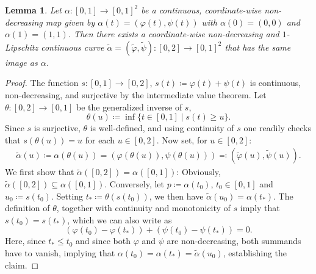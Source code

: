 \documentclass[a4paper,11pt]{article}
\numberwithin{equation}{section}
\theoremstyle{plain}
\newtheorem{Lemma}[Definition]{Lemma}
\theoremstyle{definition}
\begin{document}
\begin{appendices}
\begin{Lemma}\label{Lem:parametrization} Let $\alpha \colon [0, 1] \to [0, 1]^2$ be a continuous, coordinate-wise non-decreasing map given by $\alpha(t) = (\varphi(t), \psi(t))$ with $\alpha(0) = (0, 0)$ and $\alpha(1) = (1, 1)$. Then there exists a coordinate-wise non-decreasing and $1$-Lipschitz continuous curve $\tilde{\alpha} = (\tilde{\varphi},\tilde{\psi}) \colon [0,2] \to [0,1]^2$ that has the same image as $\alpha$.
\end{Lemma}
\begin{proof} The function $s \colon [0,1]\to [0,2]$, $s(t) \coloneqq \varphi(t)+\psi(t)$ is continuous, non-decreasing, and surjective by the
intermediate value theorem. Let $\theta \colon [0,2] \to [0,1]$ be the generalized inverse of $s$,
\[
\theta(u) \coloneqq \inf \{ t\in [0,1] \mid s(t) \ge u \}.
\]
Since $s$ is surjective, $\theta$ is well-defined, and using continuity of $s$ one readily checks that $s(\theta(u)) = u$ for each $u\in [0,2]$. Now set, for $u\in [0,2]$:
\begin{align*}
    \tilde \alpha(u) \coloneqq \alpha(\theta(u)) = (\varphi(\theta(u)),\psi(\theta(u))) \eqqcolon (\tilde\varphi(u),\tilde\psi(u)).
\end{align*}
We first show that $\tilde\alpha([0,2]) = \alpha([0,1])$: Obviously, $\tilde\alpha([0,2]) \subseteq \alpha([0,1])$. Conversely, let
$p \coloneqq \alpha(t_0)$, $t_0\in [0,1]$ and $u_0 \coloneqq s(t_0)$. Setting $t_* \coloneqq \theta(s(t_0))$, we then have $\tilde\alpha(u_0) = \alpha(t_*)$. The definition of $\theta$, together with continuity and monotonicity of $s$ imply that $s(t_0)=s(t_*)$,
which we can also write as
\[
(\varphi(t_0)-\varphi(t_*)) + (\psi(t_0)-\psi(t_*)) = 0.
\]
Here, since $t_*\le t_0$ and since both $\varphi$ and $\psi$ are non-decreasing, both summands have to vanish, implying that $\alpha(t_0) = \alpha(t_*) =\tilde \alpha(u_0)$, establishing the claim.


\end{proof}
\end{appendices}
\end{document}
